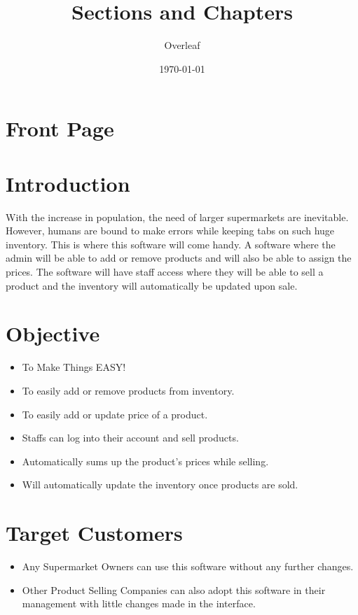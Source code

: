 \documentclass{article}
\title{Sections and Chapters}
\author{Overleaf}
\date{\today}
\begin{document}
\section*{Front Page}
\pagebreak

{\Large \bf\tableofcontents}

\pagebreak

\section*{\LARGE Introduction}
\large With the increase in population, the need of larger supermarkets are inevitable. 
However, humans are bound to make errors while keeping tabs on such huge inventory. This is where this software will come handy. A software where the admin will be able to add or remove products and  will also be able to assign the prices. The software will have staff access where they will be able to sell a product and the inventory will automatically be updated upon sale.


\section*{\LARGE Objective}
\large 
\begin{itemize}
    \item \large To Make Things EASY!
    \item \large To easily add or remove products from inventory. 
    \item \large To easily add or update price of a product.
    \item \large Staffs can log into their account and sell products.
    \item \large Automatically sums up the product's prices while selling.
    \item \large Will automatically update the inventory once products are sold.
    
\end{itemize}

\section*{\LARGE Target Customers}
\large 
\begin{itemize}
    \item \large Any Supermarket Owners can use this software without any further changes. 
    \item \large Other Product Selling Companies can also adopt this software in their management with little changes made in the interface.
\end{itemize}
\end{document}
